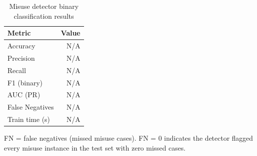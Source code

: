 \begin{table}[htbp]
  \centering
  \caption{Misuse detector binary classification results}
  \label{tab:misuse_results}
  \renewcommand{\arraystretch}{1.15}
  \begin{tabular}{lr}
    \toprule
    \textbf{Metric} & \textbf{Value} \\
    \midrule
    Accuracy & N/A \\
    Precision & N/A \\
    \midrule
    Recall & N/A \\
    F1 (binary) & N/A \\
    AUC (PR) & N/A \\
    False Negatives & N/A \\
    Train time (s) & N/A \\
    \bottomrule
  \end{tabular}
  \begin{tablenotes}
    \small \item FN = false negatives (missed misuse cases). FN = 0 indicates the detector flagged every misuse instance in the test set with zero missed cases.
  \end{tablenotes}
\end{table}

